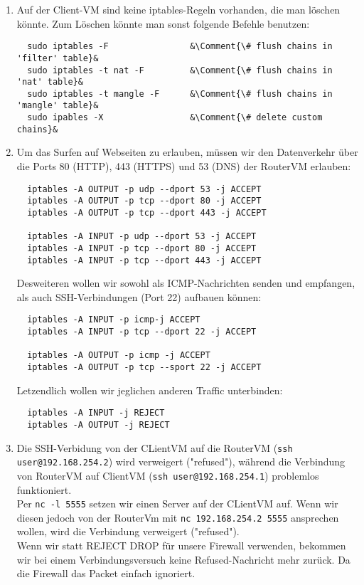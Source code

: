 \documentclass{scrartcl}
\newcommand*{\Comment}[1]{\hfill\makebox[8.0cm][l]{#1}}%
\begin{document}
\begin{enumerate}[\bfseries 1.]
	\item Auf der Client-VM sind keine iptables-Regeln vorhanden, die man
	      löschen könnte. Zum Löschen könnte man sonst folgende Befehle benutzen:

	      \begin{lstlisting}
  sudo iptables -F                &\Comment{\# flush chains in 'filter' table}&
  sudo iptables -t nat -F         &\Comment{\# flush chains in 'nat' table}&
  sudo iptables -t mangle -F      &\Comment{\# flush chains in 'mangle' table}&
  sudo ipables -X                 &\Comment{\# delete custom chains}&
	\end{lstlisting}

	\item  Um das Surfen auf Webseiten zu erlauben, müssen wir den Datenverkehr über
	      die Ports 80 (HTTP), 443 (HTTPS) und 53 (DNS) der RouterVM erlauben:
	      \begin{lstlisting}
  iptables -A OUTPUT -p udp --dport 53 -j ACCEPT
  iptables -A OUTPUT -p tcp --dport 80 -j ACCEPT
  iptables -A OUTPUT -p tcp --dport 443 -j ACCEPT

  iptables -A INPUT -p udp --dport 53 -j ACCEPT
  iptables -A INPUT -p tcp --dport 80 -j ACCEPT
  iptables -A INPUT -p tcp --dport 443 -j ACCEPT
	\end{lstlisting}
	Desweiteren wollen wir sowohl als ICMP-Nachrichten senden und
	empfangen, als auch SSH-Verbindungen (Port 22) aufbauen können:
	\begin{lstlisting}
  iptables -A INPUT -p icmp-j ACCEPT
  iptables -A INPUT -p tcp --dport 22 -j ACCEPT

  iptables -A OUTPUT -p icmp -j ACCEPT
  iptables -A OUTPUT -p tcp --sport 22 -j ACCEPT
	\end{lstlisting}
	Letzendlich wollen wir jeglichen anderen Traffic unterbinden:
	\begin{lstlisting}
  iptables -A INPUT -j REJECT
  iptables -A OUTPUT -j REJECT
	\end{lstlisting}

	\item
	      Die SSH-Verbidung von der CLientVM auf die RouterVM
	      (\texttt{ssh user@192.168.254.2}) wird verweigert ("refused"),
	      während die Verbindung von RouterVM auf ClientVM
	      (\texttt{ssh user@192.168.254.1}) problemlos funktioniert.\\
	      Per \texttt{nc -l 5555} setzen wir einen Server auf der CLientVM
	      auf. Wenn wir diesen jedoch von der RouterVm mit
	      \texttt{nc 192.168.254.2 5555} ansprechen wollen, wird die
	      Verbindung verweigert ("refused").\\
	      Wenn wir statt REJECT DROP für unsere Firewall verwenden,
	      bekommen wir bei einem Verbindungsversuch keine Refused-Nachricht
	      mehr zurück. Da die Firewall das Packet einfach ignoriert.


\end{enumerate}
\end{document}
